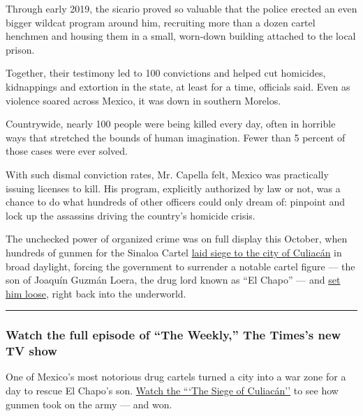 Through early 2019, the sicario proved so valuable that the police
erected an even bigger wildcat program around him, recruiting more than
a dozen cartel henchmen and housing them in a small, worn-down building
attached to the local prison.

Together, their testimony led to 100 convictions and helped cut
homicides, kidnappings and extortion in the state, at least for a time,
officials said. Even as violence soared across Mexico, it was down in
southern Morelos.

Countrywide, nearly 100 people were being killed every day, often in
horrible ways that stretched the bounds of human imagination. Fewer than
5 percent of those cases were ever solved.

With such dismal conviction rates, Mr. Capella felt, Mexico was
practically issuing licenses to kill. His program, explicitly authorized
by law or not, was a chance to do what hundreds of other officers could
only dream of: pinpoint and lock up the assassins driving the country's
homicide crisis.

The unchecked power of organized crime was on full display this October,
when hundreds of gunmen for the Sinaloa Cartel
\href{https://www.nytimes3xbfgragh.onion/2019/10/20/world/americas/culiacan-mexico-chapo-son.html}{laid
siege to the city of Culiacán} in broad daylight, forcing the government
to surrender a notable cartel figure --- the son of Joaquín Guzmán
Loera, the drug lord known as ``El Chapo'' --- and
\href{https://www.nytimes3xbfgragh.onion/2019/10/18/world/americas/mexico-cartel-chapo-son-guzman.html}{set
him loose}, right back into the underworld.

\begin{center}\rule{0.5\linewidth}{\linethickness}\end{center}

\hypertarget{watch-the-full-episode-of-the-weekly-the-timess-new-tv-show}{%
\subsubsection{Watch the full episode of ``The Weekly,'' The Times's new
TV
show}\label{watch-the-full-episode-of-the-weekly-the-timess-new-tv-show}}

One of Mexico's most notorious drug cartels turned a city into a war
zone for a day to rescue El Chapo's son.
\href{https://www.nytimes3xbfgragh.onion/2019/11/15/the-weekly/el-chapo-guzman-son.html}{Watch
the ```The Siege of Culiacán''} to see how gunmen took on the army ---
and won.

